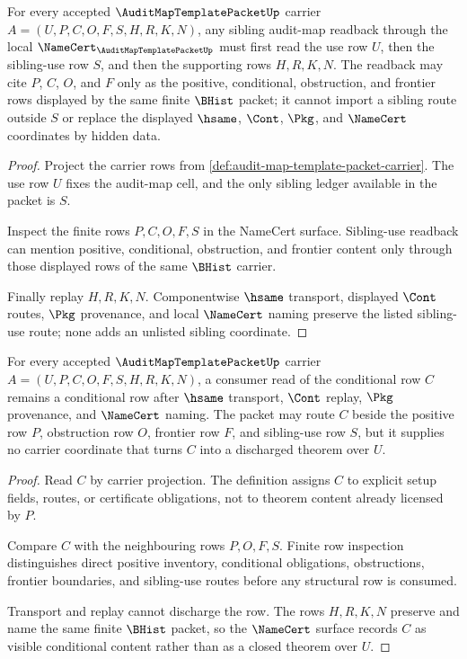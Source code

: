\begin{theorem}
\label{thm:audit-map-template-packet-sibling-use-readback}
For every accepted $\AuditMapTemplatePacketUp$ carrier $A=(U,P,C,O,F,S,H,R,K,N)$, any sibling audit-map readback through the local $\NameCert_{\AuditMapTemplatePacketUp}$ must first read the use row $U$, then the sibling-use row $S$, and then the supporting rows $H,R,K,N$. The readback may cite $P$, $C$, $O$, and $F$ only as the positive, conditional, obstruction, and frontier rows displayed by the same finite $\BHist$ packet; it cannot import a sibling route outside $S$ or replace the displayed $\hsame$, $\Cont$, $\Pkg$, and $\NameCert$ coordinates by hidden data.
\end{theorem}
\begin{proof}
Project the carrier rows from \autoref{def:audit-map-template-packet-carrier}. The use row $U$ fixes the audit-map cell, and the only sibling ledger available in the packet is $S$.

Inspect the finite rows $P,C,O,F,S$ in the NameCert surface. Sibling-use readback can mention positive, conditional, obstruction, and frontier content only through those displayed rows of the same $\BHist$ carrier.

Finally replay $H,R,K,N$. Componentwise $\hsame$ transport, displayed $\Cont$ routes, $\Pkg$ provenance, and local $\NameCert$ naming preserve the listed sibling-use route; none adds an unlisted sibling coordinate.
\end{proof}

\begin{theorem}
\label{thm:audit-map-template-packet-conditional-row-non-discharge}
For every accepted $\AuditMapTemplatePacketUp$ carrier $A=(U,P,C,O,F,S,H,R,K,N)$, a consumer read of the conditional row $C$ remains a conditional row after $\hsame$ transport, $\Cont$ replay, $\Pkg$ provenance, and $\NameCert$ naming. The packet may route $C$ beside the positive row $P$, obstruction row $O$, frontier row $F$, and sibling-use row $S$, but it supplies no carrier coordinate that turns $C$ into a discharged theorem over $U$.
\end{theorem}
\begin{proof}
Read $C$ by carrier projection. The definition assigns $C$ to explicit setup fields, routes, or certificate obligations, not to theorem content already licensed by $P$.

Compare $C$ with the neighbouring rows $P,O,F,S$. Finite row inspection distinguishes direct positive inventory, conditional obligations, obstructions, frontier boundaries, and sibling-use routes before any structural row is consumed.

Transport and replay cannot discharge the row. The rows $H,R,K,N$ preserve and name the same finite $\BHist$ packet, so the $\NameCert$ surface records $C$ as visible conditional content rather than as a closed theorem over $U$.
\end{proof}

